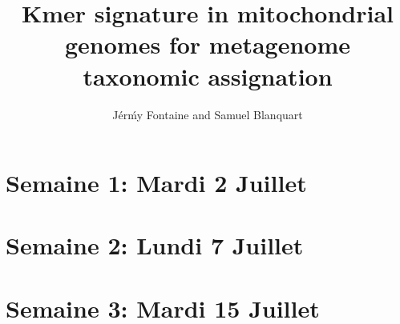 \documentclass[10pt,a4paper]{article}
\title{Kmer signature in mitochondrial genomes for metagenome taxonomic assignation}
\author{J\'er\'my Fontaine and Samuel Blanquart}
\begin{document}
\maketitle

\section{Semaine 1: Mardi 2 Juillet}


\newpage
\section{Semaine 2: Lundi 7 Juillet}


\newpage
\section{Semaine 3: Mardi 15 Juillet}




\end{document}
